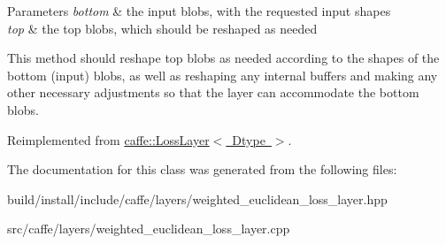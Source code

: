 \begin{DoxyParams}{Parameters}
{\em bottom} & the input blobs, with the requested input shapes \\
\hline
{\em top} & the top blobs, which should be reshaped as needed\\
\hline
\end{DoxyParams}
This method should reshape top blobs as needed according to the shapes of the bottom (input) blobs, as well as reshaping any internal buffers and making any other necessary adjustments so that the layer can accommodate the bottom blobs. 

Reimplemented from \mbox{\hyperlink{classcaffe_1_1_loss_layer_abf00412194f5413ea9468ee44b0d986f}{caffe\+::\+Loss\+Layer$<$ Dtype $>$}}.



The documentation for this class was generated from the following files\+:\begin{DoxyCompactItemize}
\item 
build/install/include/caffe/layers/weighted\+\_\+euclidean\+\_\+loss\+\_\+layer.\+hpp\item 
src/caffe/layers/weighted\+\_\+euclidean\+\_\+loss\+\_\+layer.\+cpp\end{DoxyCompactItemize}
